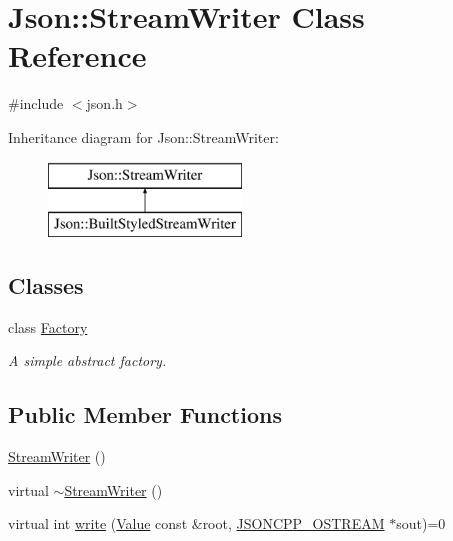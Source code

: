 \hypertarget{classJson_1_1StreamWriter}{}\section{Json\+:\+:Stream\+Writer Class Reference}
\label{classJson_1_1StreamWriter}


{\ttfamily \#include $<$json.\+h$>$}

Inheritance diagram for Json\+:\+:Stream\+Writer\+:\begin{figure}[H]
\begin{center}
\leavevmode
\includegraphics[height=2.000000cm]{classJson_1_1StreamWriter}
\end{center}
\end{figure}
\subsection*{Classes}
\begin{DoxyCompactItemize}
\item 
class \hyperlink{classJson_1_1StreamWriter_1_1Factory}{Factory}
\begin{DoxyCompactList}\small\item\em A simple abstract factory. \end{DoxyCompactList}\end{DoxyCompactItemize}
\subsection*{Public Member Functions}
\begin{DoxyCompactItemize}
\item 
\hyperlink{classJson_1_1StreamWriter_a66e6f5113618ce6b04cac9b3c85a3707_a66e6f5113618ce6b04cac9b3c85a3707}{Stream\+Writer} ()
\item 
virtual \hyperlink{classJson_1_1StreamWriter_a03f8fb6a873b6b50f05bc4556e043c3a_a03f8fb6a873b6b50f05bc4556e043c3a}{$\sim$\+Stream\+Writer} ()
\item 
virtual int \hyperlink{classJson_1_1StreamWriter_a84278bad0c9a9fc587bc2a97c5bb5993_a84278bad0c9a9fc587bc2a97c5bb5993}{write} (\hyperlink{classJson_1_1Value}{Value} const \&root, \hyperlink{json_8h_a37a25be5fca174927780caeb280094ce_a37a25be5fca174927780caeb280094ce}{J\+S\+O\+N\+C\+P\+P\+\_\+\+O\+S\+T\+R\+E\+AM} $\ast$sout)=0
\end{DoxyCompactItemize}
